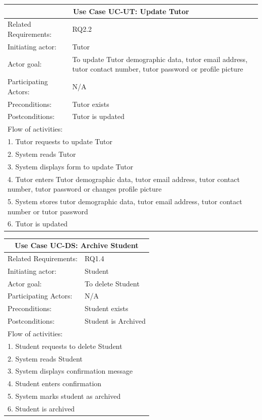 \documentclass[12pt]{article}
\begin{document}
{		%
		\begin{tabular}{| l | p{10cm}| }
			\hline\multicolumn{2}{|c|}{ \textbf{Use Case UC-UT: Update Tutor}} \\ \hline
			Related Requirements: & RQ2.2\\ \hline
			Initiating actor: & Tutor \\ \hline
			Actor goal: & To update Tutor demographic data, tutor email address, tutor contact number, tutor password or profile picture\\ \hline
			Participating Actors: & N/A\\ \hline
			Preconditions:& Tutor exists\\ \hline
			Postconditions: & Tutor is updated\\ \hline
			\multicolumn{2}{|l|}{Flow of activities:}\\ \hline
			\multicolumn{2}{|p{15cm}|}{1. Tutor requests to update Tutor}\\
			\multicolumn{2}{|p{15cm}|}{2. System reads Tutor}\\
			\multicolumn{2}{|p{15cm}|}{3. System displays form to update Tutor}\\
			\multicolumn{2}{|p{15cm}|}{4. Tutor enters Tutor demographic data, tutor email address, tutor contact number, tutor password or changes profile picture}	\\
			\multicolumn{2}{|p{15cm}|}{5. System stores tutor demographic data, tutor email address, tutor contact number or tutor password}\\
			\multicolumn{2}{|l|}{6. Tutor is updated}
			\\ \hline
		\end{tabular}



		\begin{tabular}{| l | p{10cm}| }
			\hline\multicolumn{2}{|c|}{ \textbf{Use Case UC-DS: Archive Student}} \\ \hline
			Related Requirements: & RQ1.4 \\ \hline
			Initiating actor: & Student \\ \hline
			Actor goal: & To delete Student\\ \hline
			Participating Actors: & N/A\\ \hline
			Preconditions: &Student exists\\ \hline
			Postconditions: & Student is Archived\\ \hline
			\multicolumn{2}{|l|}{Flow of activities:}\\ \hline
			\multicolumn{2}{|p{15cm}|}{1. Student requests to delete Student}\\
			\multicolumn{2}{|p{15cm}|}{2. System reads Student}\\
			\multicolumn{2}{|p{15cm}|}{3. System displays confirmation message}\\
			\multicolumn{2}{|p{15cm}|}{4. Student enters confirmation}	\\
			\multicolumn{2}{|p{15cm}|}{5. System marks student as archived}\\
			\multicolumn{2}{|l|}{6. Student is archived}
			\\ \hline
		\end{tabular}



}
\end{document}
